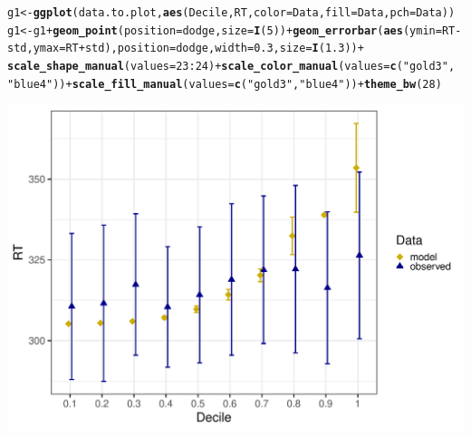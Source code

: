 \documentclass{article}\usepackage[]{graphicx}\usepackage[]{color}
\makeatletter
\def\maxwidth{ %
  \ifdim\Gin@nat@width>\linewidth
    \linewidth
  \else
    \Gin@nat@width
  \fi
}
\newcommand{\hlnum}[1]{\textcolor[rgb]{0.686,0.059,0.569}{#1}}%
\newcommand{\hlstr}[1]{\textcolor[rgb]{0.192,0.494,0.8}{#1}}%
\newcommand{\hlopt}[1]{\textcolor[rgb]{0,0,0}{#1}}%
\newcommand{\hlstd}[1]{\textcolor[rgb]{0.345,0.345,0.345}{#1}}%
\newcommand{\hlkwb}[1]{\textcolor[rgb]{0.69,0.353,0.396}{#1}}%
\newcommand{\hlkwc}[1]{\textcolor[rgb]{0.333,0.667,0.333}{#1}}%
\newcommand{\hlkwd}[1]{\textcolor[rgb]{0.737,0.353,0.396}{\textbf{#1}}}%
\newenvironment{kframe}{%
 \def\at@end@of@kframe{}%
 \ifinner\ifhmode%
  \def\at@end@of@kframe{\end{minipage}}%
  \begin{minipage}{\columnwidth}%
 \fi\fi%
 \def\FrameCommand##1{\hskip\@totalleftmargin \hskip-\fboxsep
 \colorbox{shadecolor}{##1}\hskip-\fboxsep
     \hskip-\linewidth \hskip-\@totalleftmargin \hskip\columnwidth}%
 \MakeFramed {\advance\hsize-\width
   \@totalleftmargin\z@ \linewidth\hsize
   \@setminipage}}%
 {\par\unskip\endMakeFramed%
 \at@end@of@kframe}
\newenvironment{knitrout}{}{} %
\makeatother
\begin{document}
\begin{knitrout}
\begin{kframe}
\begin{alltt}
\hlstd{g1} \hlkwb{<-} \hlkwd{ggplot}\hlstd{(data.to.plot,} \hlkwd{aes}\hlstd{(Decile, RT,} \hlkwc{color} \hlstd{= Data,} \hlkwc{fill} \hlstd{= Data,} \hlkwc{pch} \hlstd{= Data))}
\hlstd{g1} \hlkwb{<-} \hlstd{g1} \hlopt{+} \hlkwd{geom_point}\hlstd{(}\hlkwc{position} \hlstd{= dodge,} \hlkwc{size} \hlstd{=} \hlkwd{I}\hlstd{(}\hlnum{5}\hlstd{))} \hlopt{+} \hlkwd{geom_errorbar}\hlstd{(}\hlkwd{aes}\hlstd{(}\hlkwc{ymin} \hlstd{= RT} \hlopt{-}
    \hlstd{std,} \hlkwc{ymax} \hlstd{= RT} \hlopt{+} \hlstd{std),} \hlkwc{position} \hlstd{= dodge,} \hlkwc{width} \hlstd{=} \hlnum{0.3}\hlstd{,} \hlkwc{size} \hlstd{=} \hlkwd{I}\hlstd{(}\hlnum{1.3}\hlstd{))} \hlopt{+}
    \hlkwd{scale_shape_manual}\hlstd{(}\hlkwc{values} \hlstd{=} \hlnum{23}\hlopt{:}\hlnum{24}\hlstd{)} \hlopt{+} \hlkwd{scale_color_manual}\hlstd{(}\hlkwc{values} \hlstd{=} \hlkwd{c}\hlstd{(}\hlstr{"gold3"}\hlstd{,}
    \hlstr{"blue4"}\hlstd{))} \hlopt{+} \hlkwd{scale_fill_manual}\hlstd{(}\hlkwc{values} \hlstd{=} \hlkwd{c}\hlstd{(}\hlstr{"gold3"}\hlstd{,} \hlstr{"blue4"}\hlstd{))} \hlopt{+} \hlkwd{theme_bw}\hlstd{(}\hlnum{28}\hlstd{)}
\end{alltt}
\end{kframe}
\end{knitrout}
\begin{knitrout}
\color{fgcolor}
\includegraphics[width=\maxwidth]{figures/figure_ns_unnamed-chunk-17-1} 

\end{knitrout}
\end{document}
